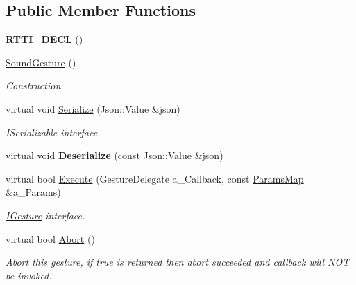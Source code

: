 \subsection*{Public Member Functions}
\begin{DoxyCompactItemize}
\item 
\mbox{\label{class_sound_gesture_a1b363ad9ef05bece9d1cffd748092a6a}} 
{\bfseries R\+T\+T\+I\+\_\+\+D\+E\+CL} ()
\item 
\mbox{\label{class_sound_gesture_aa415eb13b652e6d2843853dd7788cf0c}} 
\hyperlink{class_sound_gesture_aa415eb13b652e6d2843853dd7788cf0c}{Sound\+Gesture} ()
\begin{DoxyCompactList}\small\item\em Construction. \end{DoxyCompactList}\item 
\mbox{\label{class_sound_gesture_a6dc35996edaaa7d958c78b3116c7fc5b}} 
virtual void \hyperlink{class_sound_gesture_a6dc35996edaaa7d958c78b3116c7fc5b}{Serialize} (Json\+::\+Value \&json)
\begin{DoxyCompactList}\small\item\em I\+Serializable interface. \end{DoxyCompactList}\item 
\mbox{\label{class_sound_gesture_a4fe2db11f73ab2f2ca4c0b4db2c29d4a}} 
virtual void {\bfseries Deserialize} (const Json\+::\+Value \&json)
\item 
\mbox{\label{class_sound_gesture_a378b3387a33072f25e9624fc4bde0dd3}} 
virtual bool \hyperlink{class_sound_gesture_a378b3387a33072f25e9624fc4bde0dd3}{Execute} (Gesture\+Delegate a\+\_\+\+Callback, const \hyperlink{class_params_map}{Params\+Map} \&a\+\_\+\+Params)
\begin{DoxyCompactList}\small\item\em \hyperlink{class_i_gesture}{I\+Gesture} interface. \end{DoxyCompactList}\item 
\mbox{\label{class_sound_gesture_a67552ec35df66f74bf977ede265a426f}} 
virtual bool \hyperlink{class_sound_gesture_a67552ec35df66f74bf977ede265a426f}{Abort} ()
\begin{DoxyCompactList}\small\item\em Abort this gesture, if true is returned then abort succeeded and callback will N\+OT be invoked. \end{DoxyCompactList}\item 

\end{DoxyCompactItemize}
